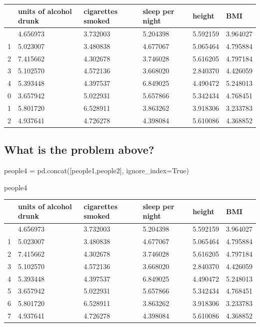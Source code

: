 \documentclass[
  letterpaper,
  DIV=11,
  numbers=noendperiod]{scrreprt}
\newenvironment{Shaded}{\begin{snugshade}}{\end{snugshade}}
\newcommand{\NormalTok}[1]{\textcolor[rgb]{0.00,0.23,0.31}{#1}}
\newcommand{\OperatorTok}[1]{\textcolor[rgb]{0.37,0.37,0.37}{#1}}
\newcommand{\VariableTok}[1]{\textcolor[rgb]{0.07,0.07,0.07}{#1}}
\begin{document}
\begin{longtable}[]{@{}llllll@{}}
\toprule\noalign{}
& units of alcohol drunk & cigarettes smoked & sleep per night & height
& BMI \\
\midrule\noalign{}
\endhead
\bottomrule\noalign{}
\endlastfoot
0 & 4.656973 & 3.732003 & 5.204398 & 5.592159 & 3.964027 \\
1 & 5.023007 & 3.480838 & 4.677067 & 5.065464 & 4.795884 \\
2 & 7.415662 & 4.302678 & 3.746028 & 5.616205 & 4.797184 \\
3 & 5.102570 & 4.572136 & 3.668020 & 2.840370 & 4.426059 \\
4 & 5.393448 & 4.397537 & 6.849025 & 4.490472 & 5.248013 \\
0 & 3.657942 & 5.022931 & 5.657866 & 5.342434 & 4.768451 \\
1 & 5.801720 & 6.528911 & 3.863262 & 3.918306 & 3.233783 \\
2 & 4.937641 & 4.726278 & 4.398084 & 5.610086 & 4.368852 \\
\end{longtable}

\hypertarget{what-is-the-problem-above}{%
\subsection{What is the problem
above?}\label{what-is-the-problem-above}}

\begin{Shaded}
\begin{Highlighting}[]
\NormalTok{people4 }\OperatorTok{=}\NormalTok{ pd.concat([people1,people2], ignore\_index}\OperatorTok{=}\VariableTok{True}\NormalTok{)}
\end{Highlighting}
\end{Shaded}

\begin{Shaded}
\begin{Highlighting}[]
\NormalTok{people4}
\end{Highlighting}
\end{Shaded}

\begin{longtable}[]{@{}llllll@{}}
\toprule\noalign{}
& units of alcohol drunk & cigarettes smoked & sleep per night & height
& BMI \\
\midrule\noalign{}
\endhead
\bottomrule\noalign{}
\endlastfoot
0 & 4.656973 & 3.732003 & 5.204398 & 5.592159 & 3.964027 \\
1 & 5.023007 & 3.480838 & 4.677067 & 5.065464 & 4.795884 \\
2 & 7.415662 & 4.302678 & 3.746028 & 5.616205 & 4.797184 \\
3 & 5.102570 & 4.572136 & 3.668020 & 2.840370 & 4.426059 \\
4 & 5.393448 & 4.397537 & 6.849025 & 4.490472 & 5.248013 \\
5 & 3.657942 & 5.022931 & 5.657866 & 5.342434 & 4.768451 \\
6 & 5.801720 & 6.528911 & 3.863262 & 3.918306 & 3.233783 \\
7 & 4.937641 & 4.726278 & 4.398084 & 5.610086 & 4.368852 \\
\end{longtable}
\end{document}
